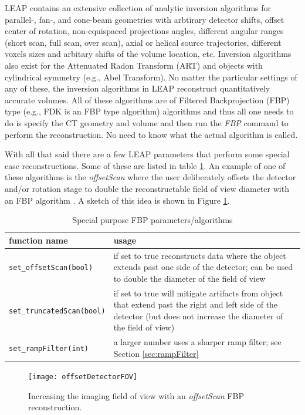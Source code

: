 \documentclass[11pt]{article}
\begin{document}
LEAP contains an extensive collection of analytic inversion algorithms for parallel-, fan-, and cone-beam geometries with arbtirary detector shifts, offset center of rotation, non-equispaced projections angles, different angular ranges (short scan, full scan, over scan), axial or helical source trajectories, different voxels sizes and arbitary shifts of the volume location, etc.  Inversion algorithms also exist for the Attenuated Radon Transform (ART) and objects with cylindrical symmetry (e.g., Abel Transform).  No matter the particular settings of any of these, the inversion algorithms in LEAP reconstruct quantitatively accurate volumes.  All of these algorithms are of Filtered Backprojection (FBP) type (e.g., FDK is an FBP type algorithm) algorithms and thus all one needs to do is specify the CT geometry and volume and then run the \textit{FBP} command to perform the reconstruction.  No need to know what the actual algorithm is called.

With all that said there are a few LEAP parameters that perform some special case reconstructions.  Some of these are listed in table \ref{tab:FBPparameters}.  An example of one of these algorithms is the \textit{offsetScan} where the user deliberately offsets the detector and/or rotation stage to double the reconstructable field of view diameter with an FBP algorithm \cite{Gullberg_TMI_1986, Gregor_ICI_2003}.  A sketch of this idea is shown in Figure \ref{fig:offsetScan}.

\begin{table}[h!] \caption{Special purpose FBP parameters/algorithms} \label{tab:FBPparameters}
\begin{tabular}{l|p{11cm}}
function name & usage \\
\hline
\texttt{set\_offsetScan(bool)} & if set to true reconstructs data where the object extends past one side of the detector; can be used to double the diameter of the field of view \\
\texttt{set\_truncatedScan(bool)} & if set to true will mitigate artifacts from object that extend past the right and left side of the detector (but does not increase the diameter of the field of view) \\
\texttt{set\_rampFilter(int)} & a larger number uses a sharper ramp filter; see Section \ref{sec:rampFilter}
\end{tabular}
\end{table}

\begin{figure}[h!]
\begin{center}
\texttt{[image: offsetDetectorFOV]}
\end{center}
\caption{Increasing the imaging field of view with an \textit{offsetScan} FBP reconstruction.} \label{fig:offsetScan}
\end{figure}
\end{document}
